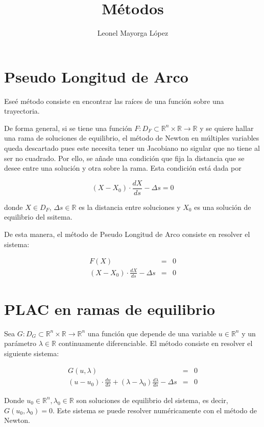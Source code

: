 \documentclass[10pt,a4paper]{article}
\author{Leonel Mayorga López}
\title{Métodos}
\begin{document}
\maketitle
\section{Pseudo Longitud de Arco}

Eseé método consiste en encontrar las raíces de una función sobre una trayectoria.

De forma general, si se tiene una función $F:D_{F}\subset\mathbb{R}^{n}\times\mathbb{R}\to\mathbb{R}$ y se quiere hallar una rama de soluciones de equilibrio, el método de Newton en múltiples variables queda descartado pues este necesita tener un Jacobiano no sigular que no tiene al ser no cuadrado. Por ello, se añade una condición que fija la distancia que se desee entre una solución y otra sobre la rama. Esta condición está dada por 

$$(X-X_{0})\cdot\dfrac{dX}{ds} - \Delta s = 0$$

donde $X\in D_{F}$, $\Delta s \in \mathbb{R}$ es la distancia entre soluciones y $X_{0}$ es una solución de equilibrio del ssitema.

De esta manera, el método de Pseudo Longitud de Arco consiste en resolver el sistema:

$$\begin{array}{rcl} F(X) & = & 0 \\ (X-X_{0})\cdot\frac{dX}{ds} - \Delta s & = & 0 \end{array}$$

\section{PLAC en ramas de equilibrio}

Sea $G:D_{G}\subset\mathbb{R}^{n}\times\mathbb{R}\rightarrow\mathbb{R}^{n}$ una función que depende de una variable  $u\in\mathbb{R}^{n}$ y un parámetro $\lambda\in\mathbb{R}$ continuamente diferenciable. El método consiste en resolver el siguiente sistema:

$$\begin{array}{rcl} G(u,\lambda) & = & 0 \\ (u - u_{0})\cdot\frac{du}{ds} + (\lambda - \lambda_{0})\frac{d\lambda}{ds} - \Delta	s & = & 0 \end{array}$$

Donde $u_{0}\in\mathbb{R}^{n}, \lambda_0\in\mathbb{R}$ son soluciones de equilibrio del sistema, es decir, $G(u_{0},\lambda_{0}) = 0$. Este sistema se puede resolver numéricamente con el método de Newton.
\end{document}
